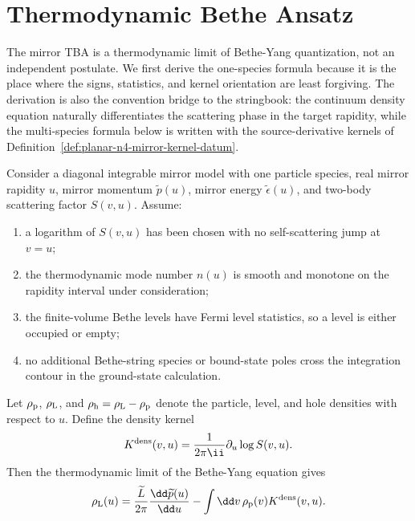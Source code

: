 \section{Thermodynamic Bethe Ansatz}

The mirror TBA is a thermodynamic limit of Bethe-Yang quantization, not an
independent postulate.  We first derive the one-species formula because it is
the place where the signs, statistics, and kernel orientation are least
forgiving.  The derivation is also the convention bridge to the stringbook:
the continuum density equation naturally differentiates the scattering phase in
the target rapidity, while the multi-species formula below is written with the
source-derivative kernels of
Definition~\ref{def:planar-n4-mirror-kernel-datum}.

\begin{proposition}
\label{prop:one-species-mirror-tba-derivation}
Consider a diagonal integrable mirror model with one particle species,
real mirror rapidity \(u\), mirror momentum \(\widetilde p(u)\), mirror
energy \(\widetilde\epsilon(u)\), and two-body scattering factor
\(S(v,u)\).  Assume:
\begin{enumerate}
\item a logarithm of \(S(v,u)\) has been chosen with no self-scattering jump at
  \(v=u\);
\item the thermodynamic mode number \(n(u)\) is smooth and monotone on the
  rapidity interval under consideration;
\item the finite-volume Bethe levels have Fermi level statistics, so a level is
  either occupied or empty;
\item no additional Bethe-string species or bound-state poles cross the
  integration contour in the ground-state calculation.
\end{enumerate}
Let \(\rho_{\rm p}\), \(\rho_{\rm L}\), and
\(\rho_{\rm h}=\rho_{\rm L}-\rho_{\rm p}\) denote the particle, level, and hole
densities with respect to \(u\).  Define the density kernel
\begin{equation}
  K^{\rm dens}(v,u)
  =
  \frac{1}{2\pi\ii}\partial_u\log S(v,u).
  \label{eq:one-species-density-kernel}
\end{equation}
Then the thermodynamic limit of the Bethe-Yang equation gives
\begin{equation}
  \rho_{\rm L}(u)
  =
  \frac{\widetilde L}{2\pi}
  \frac{\dd \widetilde p(u)}{\dd u}
  -
  \int\dd v\,\rho_{\rm p}(v)K^{\rm dens}(v,u).
  \label{eq:one-species-density-equation}

\end{equation}
\end{proposition}
